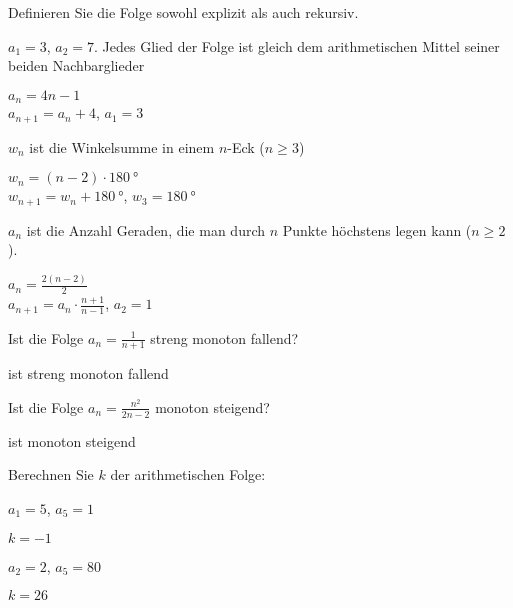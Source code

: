 \begin{exercisesK}
Definieren Sie die Folge sowohl explizit als auch rekursiv.
\twocol
\begin{exercise} $a_{1}=3$, $a_{2} = 7$. Jedes Glied der Folge ist gleich dem arithmetischen Mittel seiner beiden Nachbarglieder\begin{answer}  $a_{n} = 4n-1$ \\ $a_{n+1}=a_{n} + 4$, $a_{1}=3$ 
\end{answer}
\end{exercise}
\begin{exercise} $w_{n}$ ist die Winkelsumme in einem $n$-Eck ($n \geq3$)\begin{answer}  $w_{n} = (n-2) \cdot \SI{180}{\degree}$ \\ $w_{n+1}=w_{n} + \SI{180}{\degree}$, $w_{3}=\SI{180}{\degree}$
\end{answer}
\end{exercise}
\begin{exercise} $a_{n}$ ist die Anzahl Geraden, die man durch $n$ Punkte höchstens legen kann ($n \geq 2$).\begin{answer}   $a_{n} = \frac{2(n-2)}{2}$ \\ $a_{n+1}=a_{n} \cdot \frac{n+1}{n-1}$, $a_{2}=1$
\end{answer}
\end{exercise}

\endtwocol

\twocol
\begin{exercise} Ist die Folge $a_{n} = \frac{1}{n+1}$ streng monoton fallend?\begin{answer}  ist streng monoton fallend
\end{answer}
\end{exercise}


\begin{exercise} Ist die Folge $a_{n} = \frac{n^{2}}{2n -2}$ monoton steigend? \begin{answer}  ist monoton steigend
\end{answer}
\end{exercise}

\endtwocol

Berechnen Sie $k$ der arithmetischen Folge:
\twocol
\begin{exercise} $a_{1}=5$, $a_{5}=1$ \begin{answer}  $k=-1$
\end{answer}
\end{exercise}

\begin{exercise} $a_{2}=2$, $a_{5}=80$ \begin{answer}  $k=26$
\end{answer}
\end{exercise}


\end{exercisesK}

